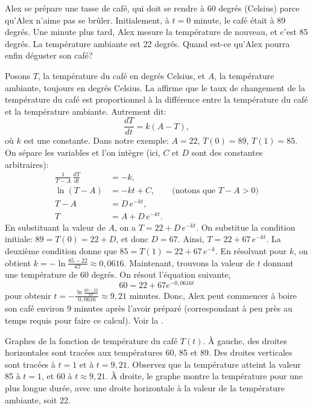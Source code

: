 \begin{example} \label{sep:coffeeexample}
	Alex se prépare une tasse de café, qui doit se rendre à 60 degrés (Celsius) parce qu'Alex n'aime pas se brûler.
	Initialement, à $t=0$ minute,
	le café était à 89 degrés.  Une minute plus tard, Alex mesure la température de nouveau, et c'est 85 degrés.
	La température ambiante est 22 degrés.  Quand est-ce qu'Alex pourra enfin déguster son café?

	Posons $T$, la température du café en degrés Celsius, et $A$, la température ambiante, toujours en degrés Celsius.
	La 	 affirme que le taux de changement de la température du café est
	proportionnel à la différence entre la température du café et la température ambiante.  Autrement dit:
	\begin{equation*}
		\frac{dT}{dt} = k(A-T),
	\end{equation*}
	où $k$ est une constante.
	Dans notre exemple: $A=22$, $T(0) = 89$, $T(1) = 85$.
	On sépare les variables et l'on intègre (ici, $C$ et $D$ sont des constantes arbitraires):
	\begin{align*}
		\frac{1}{T-A} \, \frac{dT}{dt} & = -k , \\
							\ln (T-A)  &= -kt + C , \qquad \text{(notons que } T-A > 0 \text{)} \\
								T-A    &= D\, e^{-kt} ,  \\
								T      &= A + D\, e^{-kt} .
	\end{align*}
	En substituant la valeur de $A$, on a
	$T = 22 + D\, e^{-kt}$.
	On substitue la condition initiale: $89 = T(0) = 22 + D$,
	et donc $D = 67$.
	Ainsi,  $T = 22 + 67\, e^{-kt}$.
	La deuxième condition donne que $85 = T(1) = 22 + 67\, e^{-k}$.
	En résolvant pour $k$, on obtient 	$k = - \ln \frac{85-22}{67} \approx 0{,}0616$.
	Maintenant, trouvons la valeur de $t$ donnant une température de 60 degrés.
	On résout l'équation suivante,
	\begin{equation*}
		60 = 22 + 67 e^{-0{,}0616t}
	\end{equation*}
	pour obtenir
	$t = - \frac{\ln \frac{60-22}{67}}{0{,}0616} \approx 9{,}21$ minutes.
	Donc, Alex peut commencer à boire son café environ 9 minutes après l'avoir préparé (correspondant à peu près au temps requis pour faire ce calcul).  Voir la .
	\begin{myfig}
		\capstart		{}
		\caption{Graphes de la fonction de température du café $T(t)$.
		À gauche, des droites horizontales sont tracées aux températures 60, 85 et 89.
		Des droites verticales sont tracées à $t=1$ et à $t=9{,}21$.
		Observez que la température atteint la valeur 85 à $t=1$, et 60 à
		$t \approx 9{,}21$.  À droite, le graphe montre la température pour une plus longue durée,
		avec une droite horizontale à la valeur de la température ambiante, soit 22.\label{sintro:coffeefig}}
	\end{myfig}
\end{example}

